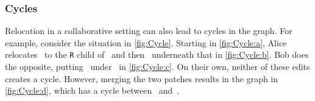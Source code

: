






\subsubsection{Cycles}%
\label{sub:Multi-User Cycles}

\figureCycle
\figureDisconnect

Relocation in a collaborative setting can also lead to cycles in the graph. 
For example, consider the situation in \autoref{fig:Cycle}.
Starting in \autoref{fig:Cycle:a}, 
Alice relocates~\vMultiCycleTimes{} to the \texttt{R} child of~\vWrapPlus{}
and then~\vMultiCyclePlus{} underneath that in \autoref{fig:Cycle:b}.
Bob does the opposite, putting~\vMultiCycleTimes{} under~\vMultiCyclePlus{} in \autoref{fig:Cycle:c}. On their own, neither of these edits creates a cycle.
However, merging the two patches results in the graph
in \autoref{fig:Cycle:d}, which has a cycle
between~\vMultiCycleTimes{} and~\vMultiCyclePlus{}.

